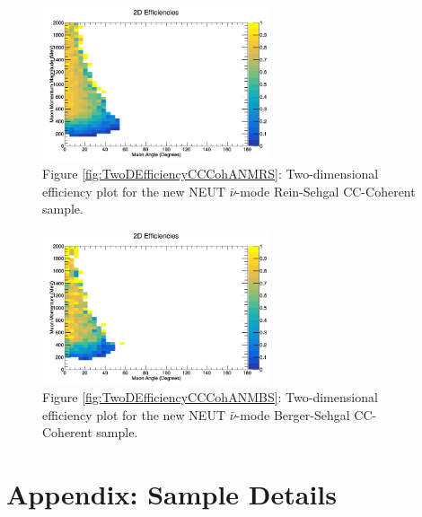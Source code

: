 \documentclass[11pt]{article}
\begin{document}
\begin{figure}[H]
\centering
\includegraphics[width=0.6\textwidth]{CCCohPlots/2DEffANMRS.png}
\caption*{Figure \ref*{fig:TwoDEfficiencyCCCohANMRS}: Two-dimensional efficiency plot for the new NEUT $\bar{\nu}$-mode Rein-Sehgal CC-Coherent sample.}
\end{figure}\label{fig:TwoDEfficiencyCCCohANMRS}

\begin{figure}[H]
\centering
\includegraphics[width=0.6\textwidth]{CCCohPlots/2DEffANMBS.png}
\caption*{Figure \ref*{fig:TwoDEfficiencyCCCohANMBS}: Two-dimensional efficiency plot for the new NEUT $\bar{\nu}$-mode Berger-Sehgal CC-Coherent sample.}
\end{figure}\label{fig:TwoDEfficiencyCCCohANMBS}



%
\newpage

\appendix


\section{Appendix: Sample Details}\label{sec:SampleAppendix}
\end{document}
